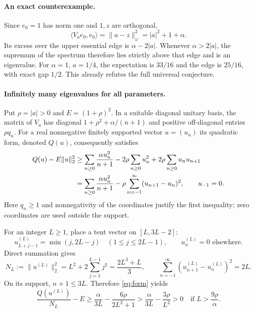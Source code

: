 \documentclass[11pt]{article}
\begin{document}
\paragraph{An exact counterexample.}
Since $e_0=1$ has norm one and $1,z$ are orthogonal,
\begin{equation}\label{eq:onevector}
 \langle V_a e_0,e_0\rangle
 =\|a-z\|_\omega^2=|a|^2+1+\alpha.
\end{equation}
Its excess over the upper essential edge is $\alpha-2|a|$.
Whenever $\alpha>2|a|$, the supremum of the spectrum therefore lies
strictly above that edge and is an eigenvalue.
For $\alpha=1$, $a=1/4$, the expectation is $33/16$ and the edge is
$25/16$, with exact gap $1/2$. This already refutes the full universal
conjecture.

\paragraph{Infinitely many eigenvalues for all parameters.}
Put $\rho=|a|>0$ and $E=(1+\rho)^2$.
In a suitable diagonal unitary basis, the matrix of $V_a$ has diagonal
$1+\rho^2+\alpha/(n+1)$ and positive off-diagonal entries $\rho q_n$.
For a real nonnegative finitely supported vector $u=(u_n)$ its quadratic
form, denoted $Q(u)$, consequently satisfies
\begin{align}
 Q(u)-E\|u\|_2^2
 &\geq \sum_{n\geq0}\frac{\alpha u_n^2}{n+1}
       -2\rho\sum_{n\geq0}u_n^2
       +2\rho\sum_{n\geq0}u_nu_{n+1}\notag\\
 &=\sum_{n\geq0}\frac{\alpha u_n^2}{n+1}
       -\rho\sum_{n=-1}^{\infty}(u_{n+1}-u_n)^2,
       \qquad u_{-1}=0.                         \label{eq:form}
\end{align}
Here $q_n\geq1$ and nonnegativity of the coordinates justify the first
inequality; zero coordinates are used outside the support.

For an integer $L\geq1$, place a tent vector on $[L,3L-2]$:
\[
 u^{(L)}_{L+j-1}=\min(j,2L-j)\quad(1\leq j\leq2L-1),
 \qquad u^{(L)}_n=0\text{ elsewhere}.
\]
Direct summation gives
\begin{equation}\label{eq:tent}
 N_L:=\|u^{(L)}\|_2^2
 =L^2+2\sum_{j=1}^{L-1}j^2=\frac{2L^3+L}{3},
 \qquad
 \sum_{n=-1}^{\infty}(u^{(L)}_{n+1}-u^{(L)}_n)^2=2L.
\end{equation}
On its support, $n+1\leq3L$. Therefore \eqref{eq:form} yields
\begin{equation}\label{eq:positive}
 \frac{Q(u^{(L)})}{N_L}-E
 \geq\frac{\alpha}{3L}-\frac{6\rho}{2L^2+1}
 >\frac{\alpha}{3L}-\frac{3\rho}{L^2}>0
 \quad\text{if }L>\frac{9\rho}{\alpha}.
\end{equation}
\end{document}

